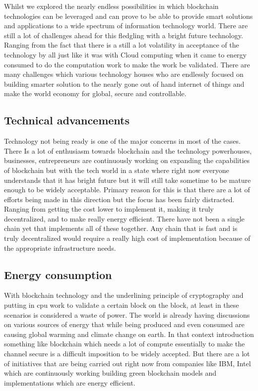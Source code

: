 Whilst we explored the nearly endless possibilities in which
blockchain technologies can be leveraged and can prove to be able to
provide smart solutions and applications to a wide spectrum of
information technology world. There are still a lot of challenges
ahead for this fledgling with a bright future technology. Ranging from
the fact that there is a still a lot volatility in acceptance of the
technology by all just like it was with Cloud computing when it came
to energy consumed to do the computation work to make the work be
validated. There are many challenges which various technology houses
who are endlessly focused on building smarter solution to the nearly
gone out of hand internet of things and make the world economy for
global, secure and controllable.

\subsection{Technical advancements}

Technology not being ready is one of the major concerns in most of the
cases. There Is a lot of enthusiasm towards blockchain and the
technology powerhouses, businesses, entrepreneurs are continuously
working on expanding the capabilities of blockchain but with the tech
world in a state where right now everyone understands that it has
bright future but it will still take sometime to be mature enough to
be widely acceptable. Primary reason for this is that there are a lot
of efforts being made in this direction but the focus has been fairly
distracted. Ranging from getting the cost lower to implement it,
making it truly decentralized, and to make really energy efficient.
There have not been a single chain yet that implements all of these
together. Any chain that is fast and is truly decentralized would
require a really high cost of implementation because of the
appropriate infrastructure needs.

\subsection{Energy consumption}

With blockchain technology and the underlining principle of
cryptography and putting in cpu work to validate a certain block on
the block, at least in these scenarios is considered a waste of power.
The world is already having discussions on various sources of energy
that while being produced and even consumed are causing global warming
and climate change on earth. In that context introduction something
like blockchain which needs a lot of compute essentially to make the
channel secure is a difficult imposition to be widely accepted. But
there are a lot of initiatives that are being carried out right now
from companies like IBM, Intel which are continuously working building
green blockchain models and implementations which are energy
efficient.

